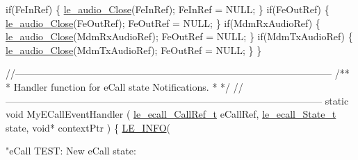 \begin{DoxyCodeInclude}
{{{{    \textcolor{keywordflow}{if}(FeInRef)
    \{
        \hyperlink{le__audio__interface_8h_abafeb411da7b1a14b2d5777fc1d3e394}{le\_audio\_Close}(FeInRef);
        FeInRef = NULL;
    \}
    \textcolor{keywordflow}{if}(FeOutRef)
    \{
        \hyperlink{le__audio__interface_8h_abafeb411da7b1a14b2d5777fc1d3e394}{le\_audio\_Close}(FeOutRef);
        FeOutRef = NULL;
    \}
    \textcolor{keywordflow}{if}(MdmRxAudioRef)
    \{
        \hyperlink{le__audio__interface_8h_abafeb411da7b1a14b2d5777fc1d3e394}{le\_audio\_Close}(MdmRxAudioRef);
        FeOutRef = NULL;
    \}
    \textcolor{keywordflow}{if}(MdmTxAudioRef)
    \{
        \hyperlink{le__audio__interface_8h_abafeb411da7b1a14b2d5777fc1d3e394}{le\_audio\_Close}(MdmTxAudioRef);
        FeOutRef = NULL;
    \}
\}

\textcolor{comment}{//--------------------------------------------------------------------------------------------------}\textcolor{comment}{}
\textcolor{comment}{/**}
\textcolor{comment}{ * Handler function for eCall state Notifications.}
\textcolor{comment}{ *}
\textcolor{comment}{ */}
\textcolor{comment}{//--------------------------------------------------------------------------------------------------}
\textcolor{keyword}{static} \textcolor{keywordtype}{void} MyECallEventHandler
(
    \hyperlink{le__ecall__interface_8h_a8536728653b7b3cdd6b298c6e7b67705}{le\_ecall\_CallRef\_t}  eCallRef,
    \hyperlink{le__ecall__interface_8h_a233609e4724e549a1405f9177c0a07dd}{le\_ecall\_State\_t}    state,
    \textcolor{keywordtype}{void}*               contextPtr
)
\{
    \hyperlink{le__log_8h_a23e6d206faa64f612045d688cdde5808}{LE\_INFO}(\textcolor{stringliteral}{"eCall TEST: New eCall state: %

}}}}}
\end{DoxyCodeInclude}
